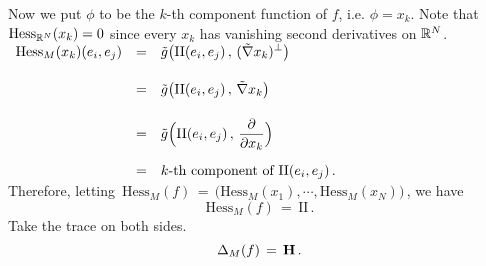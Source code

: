 \documentclass{article}[12pt,a4paper]
\begin{document}
Now we put $\phi$ to be the $k$-th component function of $f$, i.e. $\phi = x_k$. Note that $\mbox{Hess}_{\mathbb{R}^N}(x_k) = 0$
since every $x_k$ has vanishing second derivatives on $\mathbb{R}^N$. \\[0.2in]
$\begin{array}{rcl}
\mbox{Hess}_M(x_k)(e_i, e_j) &=& \displaystyle 
	\tilde{g}\big(\mbox{II}(e_i, e_j)\,,\, (\tilde{\nabla}x_k)^\perp \big) \\[0.2in]
&=& \displaystyle 
	\tilde{g}\big(\mbox{II}(e_i, e_j)\,,\, \tilde{\nabla}x_k \big) \\[0.2in]
&=& \displaystyle 
	\tilde{g}\Big(\mbox{II}(e_i, e_j)\,,\, \frac{\partial}{\partial x_k}\Big) \\[0.2in]
&=& \displaystyle 
	\mbox{$k$-th component of } \mbox{II}(e_i, e_j)\,.	
\end{array}$ \\[0.1in]

Therefore, letting \,$\mbox{Hess}_M(f) \,=\, \big(\mbox{Hess}_M(x_1), \cdots, \mbox{Hess}_M(x_N)\big)$\,, we have
\begin{equation}
	\mbox{Hess}_M(f) \,=\, \mbox{II}\,.
\end{equation}
Take the trace on both sides. 
\begin{equation}
	\Delta_M(f) \,=\, {\bf H}\,.
\end{equation}

\vfill
{}

\end{document}

